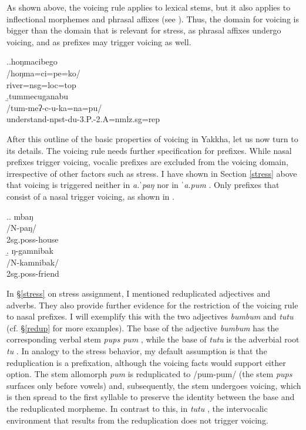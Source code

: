 As shown above, the voicing rule applies to lexical stems, but it also applies to inflectional morphemes and phrasal affixes (see \Next). Thus, the domain for voicing is bigger than the domain that is relevant for stress, as phrasal affixes undergo voicing, and as prefixes may trigger voicing as well.


\ex.\label{hongma}\a.\glll	hoŋmacibego\\
	 /hoŋma=ci=pe=ko/\\
		river{\sc =nsg=loc=top}\\
\b.\glll tummecuganabu\\
/tum-meʔ-c-u-ka=na=pu/\\
understand{\sc -npst-du-3.P.-2.A=nmlz.sg=rep}\\


After this outline of the basic properties of voicing in Yakkha, let us now turn to its details. 
The voicing rule needs further specification for prefixes. While nasal prefixes trigger voicing, vocalic prefixes are excluded from the voicing domain, irrespective of other factors such as stress. I have shown in Section \ref{stress} above that voicing is triggered neither in \emph{a.ˈpaŋ}  nor in \emph{ˈa.pum} . Only prefixes that consist of a nasal trigger voicing, as shown in \Next.


\ex.\a. \glll mbaŋ\\
/N-paŋ/\\
{\sc 2sg.poss-}house\\
\b. \glll ŋ-gamnibak\\
/N-kamnibak/\\
{\sc 2sg.poss-}friend\\

		 		 
In §\ref{stress} on stress assignment, I mentioned reduplicated adjectives and adverbs. They also provide further evidence for the restriction of the voicing rule to nasal prefixes. I will exemplify this with the two adjectives \emph{bumbum}  and \emph{tutu}  (cf. §\ref{redup} for more examples). The base of the adjective \emph{bumbum} has the corresponding verbal stem \emph{pups \ti pum} , while the base of \emph{tutu} is the adverbial root \emph{tu} . In analogy to the stress behavior, my default assumption is that the reduplication is a prefixation, although the voicing facts would support either option. The stem allomorph \emph{pum} is reduplicated to /pum-pum/ (the stem \emph{pups} surfaces only before vowels) and, subsequently, the stem undergoes voicing, which is then spread to the first syllable to preserve the identity between the base and the reduplicated morpheme. In contrast to this, in \emph{tutu} , the intervocalic environment that  results from the reduplication does not trigger voicing.  
 
